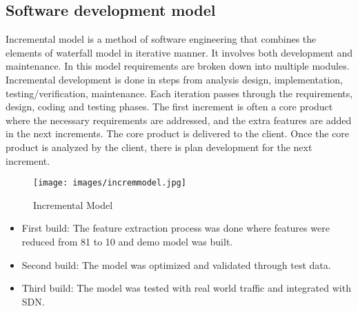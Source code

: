 \subsection{Software development model}
\vspace{-18pt}
Incremental model is a method of software engineering that combines the elements of waterfall model in iterative manner. It involves both development and maintenance. In this model requirements are broken down into multiple modules. Incremental development is done in steps from analysis design, implementation, testing/verification, maintenance. Each iteration passes through the requirements, design, coding and testing phases. The first increment is often a core product where the necessary requirements are addressed, and the extra features are added in the next increments. The core product is delivered to the client. Once the core product is analyzed by the client, there is plan development for the next increment.\par
\begin{figure}[H] %
	\begin{center}
		\texttt{[image: images/incremmodel.jpg]} 
		\caption{Incremental Model} %
		\label{Incremental Model} %
	\end{center}
\end{figure}
\begin{itemize}
	\item First build: The feature extraction process was done where features were reduced from 81 to 10 and demo model was built.
	\item Second build: The model was optimized and validated through test data.
	\item Third build: The model was tested with real world traffic and integrated with SDN.
\end{itemize}
